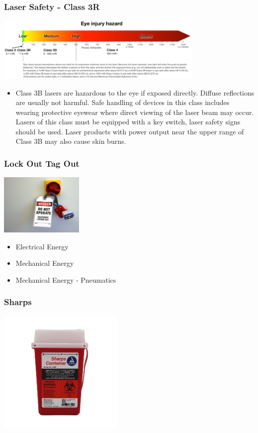 \documentclass{beamer}
\begin{document}
\begin{frame}\frametitle{Laser Safety - Class 3R}
\begin{center}
\includegraphics[width=10cm]{fig/lsafe.png}
\end{center}
\begin{itemize}
\item Class 3B lasers are hazardous to the eye if exposed directly. Diffuse reflections are usually not harmful. Safe handling of devices in this class includes wearing protective eyewear where direct viewing of the laser beam may occur. Lasers of this class must be equipped with a key switch, laser safety signs should be used. Laser products with power output near the upper range of Class 3B may also cause skin burns.
\end{itemize}
\end{frame}

\begin{frame}\frametitle{Lock Out Tag Out}
\begin{center}
\includegraphics[width=4cm]{fig/loto.jpg}
\end{center}

\begin{itemize}
\item Electrical Energy
\item Mechanical Energy
\item Mechanical Energy - Pneumatics
\end{itemize}
\end{frame}

\begin{frame}\frametitle{Sharps}
\begin{center}
\includegraphics[width=6cm]{fig/sharps.png}
\end{center}
\end{frame}
\end{document}
